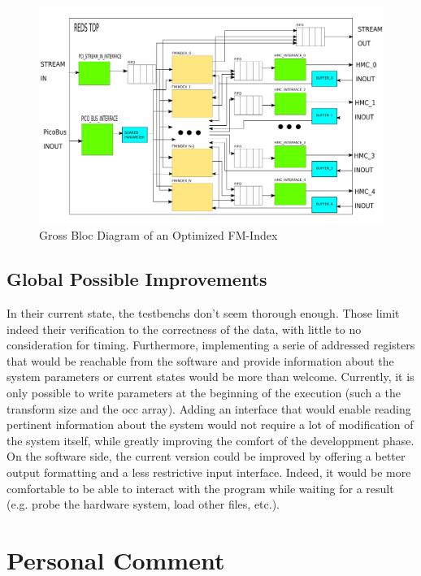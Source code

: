 \begin{figure}[H]
    \centering
    \includegraphics [scale = 0.4]{Figures/FMINDEX_DUPL_DIAG.png}
    \caption{Gross Bloc Diagram of an Optimized FM-Index}
    \label{fig:FM_FIFO}
\end{figure}

\subsection{Global Possible Improvements}

In their current state, the testbenchs don't seem thorough enough. Those limit indeed their verification to the correctness of the data, with little to no consideration for timing. Furthermore, implementing a serie of addressed registers that would be reachable from the software and provide information about the system parameters or current states would be more than welcome. Currently, it is only possible to write parameters at the beginning of the execution (such a the transform size and the occ array). Adding an interface that would enable reading pertinent information about the system would not require a lot of modification of the system itself, while greatly improving the comfort of the developpment phase. \\


On the software side, the current version could be improved by offering a better output formatting and a less restrictive input interface. Indeed, it would be more comfortable to be able to interact with the program while waiting for a result (e.g. probe the hardware system, load other files, etc.).


\section{Personal Comment}

